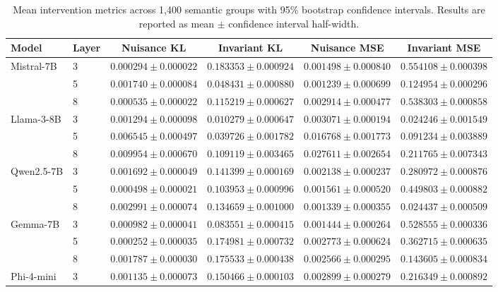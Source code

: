 \begin{table}[t]
\centering
\small
\setlength{\tabcolsep}{3pt}
\renewcommand{\arraystretch}{1.15}
\caption{Mean intervention metrics across 1,400 semantic groups
with 95\% bootstrap confidence intervals. Results are reported
as mean $\pm$ confidence interval half-width.}
\label{tab:intervention_bootstrap_ci}
\begin{tabular}{llcccc}
\toprule
Model & Layer
& Nuisance KL & Invariant KL
& Nuisance MSE & Invariant MSE \\
\midrule
Mistral-7B
& 3
& $0.000294 \pm 0.000022$
& $0.183353 \pm 0.000924$
& $0.001498 \pm 0.000840$
& $0.554108 \pm 0.000398$ \\
& 5
& $0.001740 \pm 0.000084$
& $0.048431 \pm 0.000880$
& $0.001239 \pm 0.000699$
& $0.124954 \pm 0.000296$ \\
& 8
& $0.000535 \pm 0.000022$
& $0.115219 \pm 0.000627$
& $0.002914 \pm 0.000477$
& $0.538303 \pm 0.000858$ \\
\midrule
Llama-3-8B
& 3
& $0.001294 \pm 0.000098$
& $0.010279 \pm 0.000647$
& $0.003071 \pm 0.000194$
& $0.024246 \pm 0.001549$ \\
& 5
& $0.006545 \pm 0.000497$
& $0.039726 \pm 0.001782$
& $0.016768 \pm 0.001773$
& $0.091234 \pm 0.003889$ \\
& 8
& $0.009954 \pm 0.000670$
& $0.109119 \pm 0.003465$
& $0.027611 \pm 0.002654$
& $0.211765 \pm 0.007343$ \\
\midrule
Qwen2.5-7B
& 3
& $0.001692 \pm 0.000049$
& $0.141399 \pm 0.000169$
& $0.002138 \pm 0.000237$
& $0.280972 \pm 0.000876$ \\
& 5
& $0.000498 \pm 0.000021$
& $0.103953 \pm 0.000996$
& $0.001561 \pm 0.000520$
& $0.449803 \pm 0.000882$ \\
& 8
& $0.002991 \pm 0.000074$
& $0.134659 \pm 0.001000$
& $0.001339 \pm 0.000355$
& $0.024437 \pm 0.000509$ \\
\midrule
Gemma-7B
& 3
& $0.000982 \pm 0.000041$
& $0.083551 \pm 0.000415$
& $0.001444 \pm 0.000264$
& $0.528555 \pm 0.000336$ \\
& 5
& $0.000252 \pm 0.000035$
& $0.174981 \pm 0.000732$
& $0.002773 \pm 0.000624$
& $0.362715 \pm 0.000635$ \\
& 8
& $0.001787 \pm 0.000030$
& $0.175533 \pm 0.000438$
& $0.002566 \pm 0.000295$
& $0.143605 \pm 0.000834$ \\
\midrule
Phi-4-mini
& 3
& $0.001135 \pm 0.000073$
& $0.150466 \pm 0.000103$
& $0.002899 \pm 0.000279$
& $0.216349 \pm 0.000892$ \\

\end{tabular}
\end{table}
